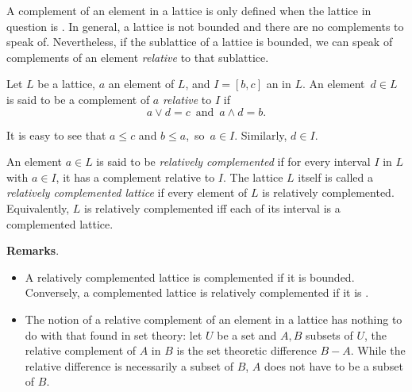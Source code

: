 \documentclass[12pt]{article}
\begin{document}

A complement of an element in a lattice is only defined when the lattice in question is .  In general, a lattice is not bounded and there are no complements to speak of.  Nevertheless, if the sublattice of a lattice is bounded, we can speak of complements of an element \emph{relative} to that sublattice.

Let $L$ be a lattice, $a$ an element of $L$, and $I=[b,c]$ an  in $L$.  An element\, $d\in L$\, is said to be a complement of $a$ \emph{relative} to $I$ if
$$a\vee d=c\,\mbox{ and }\,a\wedge d=b.$$

It is easy to see that $a\le c$ and $b\le a$,\, so\, $a\in I$.  Similarly, $d\in I$.

An element $a\in L$ is said to be \emph{relatively complemented} if for every interval $I$ in $L$ with $a\in I$, it has a complement relative to $I$.  The lattice $L$ itself is called a \emph{relatively complemented lattice} if every element of $L$ is relatively complemented.  Equivalently, $L$ is relatively complemented iff each of its interval is a complemented lattice.

\textbf{Remarks}.  
\begin{itemize}
\item A relatively complemented lattice is complemented if it is bounded.  Conversely, a complemented lattice is relatively complemented if it is 
.
\item The notion of a relative complement of an element in a lattice has nothing to do with that found in set theory: let $U$ be a set and $A,B$ subsets of $U$, the relative complement of $A$ in $B$ is the set theoretic difference $B-A$.  While the relative difference is necessarily a subset of $B$, $A$ does not have to be a subset of $B$.
\end{itemize}
\end{document}
